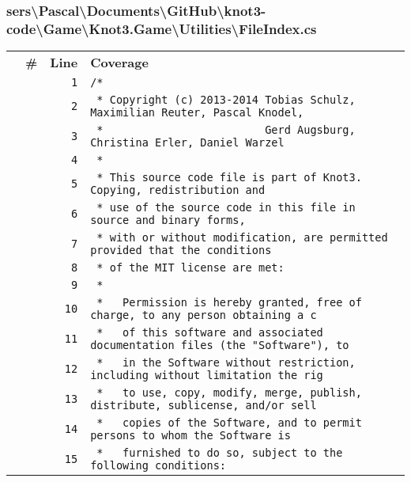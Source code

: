 \documentclass[a4paper,10pt]{article}
\begin{document}
\subsubsection{sers\textbackslash Pascal\textbackslash Documents\textbackslash GitHub\textbackslash knot3-code\textbackslash Game\textbackslash Knot3.Game\textbackslash Utilities\textbackslash FileIndex.cs}
\begin{longtable}[l]{lrrl}
\textbf{} & \textbf{\#} & \textbf{Line} & \textbf{Coverage}\\
\cellcolor{gray} &  & \verb~1~ & \verb~/*~\\
\cellcolor{gray} &  & \verb~2~ & \verb~ * Copyright (c) 2013-2014 Tobias Schulz, Maximilian Reuter, Pascal Knodel,~\\
\cellcolor{gray} &  & \verb~3~ & \verb~ *                         Gerd Augsburg, Christina Erler, Daniel Warzel~\\
\cellcolor{gray} &  & \verb~4~ & \verb~ *~\\
\cellcolor{gray} &  & \verb~5~ & \verb~ * This source code file is part of Knot3. Copying, redistribution and~\\
\cellcolor{gray} &  & \verb~6~ & \verb~ * use of the source code in this file in source and binary forms,~\\
\cellcolor{gray} &  & \verb~7~ & \verb~ * with or without modification, are permitted provided that the conditions~\\
\cellcolor{gray} &  & \verb~8~ & \verb~ * of the MIT license are met:~\\
\cellcolor{gray} &  & \verb~9~ & \verb~ *~\\
\cellcolor{gray} &  & \verb~10~ & \verb~ *   Permission is hereby granted, free of charge, to any person obtaining a c~\\
\cellcolor{gray} &  & \verb~11~ & \verb~ *   of this software and associated documentation files (the "Software"), to ~\\
\cellcolor{gray} &  & \verb~12~ & \verb~ *   in the Software without restriction, including without limitation the rig~\\
\cellcolor{gray} &  & \verb~13~ & \verb~ *   to use, copy, modify, merge, publish, distribute, sublicense, and/or sell~\\
\cellcolor{gray} &  & \verb~14~ & \verb~ *   copies of the Software, and to permit persons to whom the Software is~\\
\cellcolor{gray} &  & \verb~15~ & \verb~ *   furnished to do so, subject to the following conditions:~\\

\end{longtable}
\end{document}
